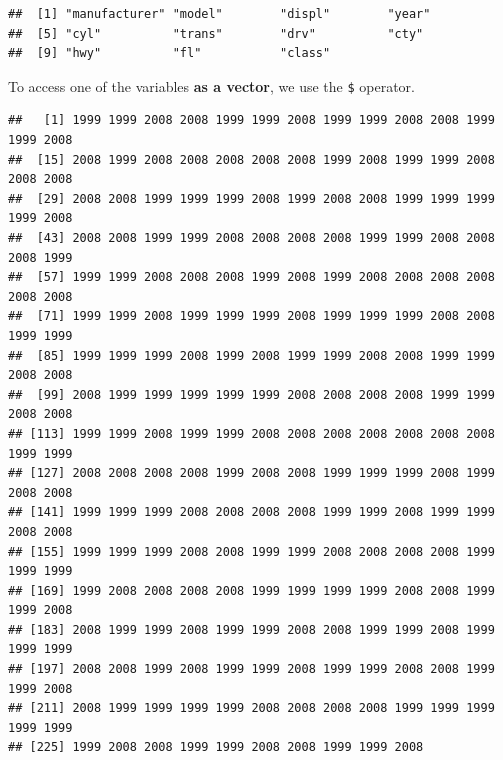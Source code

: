 \documentclass[]{book}
\newenvironment{Shaded}{\begin{snugshade}}{\end{snugshade}}
\newcommand{\OperatorTok}[1]{\textcolor[rgb]{0.81,0.36,0.00}{\textbf{#1}}}
\newcommand{\NormalTok}[1]{#1}
\theoremstyle{definition}
\theoremstyle{definition}
\theoremstyle{definition}
\theoremstyle{remark}
\begin{document}
\begin{verbatim}
##  [1] "manufacturer" "model"        "displ"        "year"        
##  [5] "cyl"          "trans"        "drv"          "cty"         
##  [9] "hwy"          "fl"           "class"
\end{verbatim}

To access one of the variables \textbf{as a vector}, we use the
\texttt{\$} operator.

\begin{Shaded}
\end{Shaded}

\begin{verbatim}
##   [1] 1999 1999 2008 2008 1999 1999 2008 1999 1999 2008 2008 1999 1999 2008
##  [15] 2008 1999 2008 2008 2008 2008 2008 1999 2008 1999 1999 2008 2008 2008
##  [29] 2008 2008 1999 1999 1999 2008 1999 2008 2008 1999 1999 1999 1999 2008
##  [43] 2008 2008 1999 1999 2008 2008 2008 2008 1999 1999 2008 2008 2008 1999
##  [57] 1999 1999 2008 2008 2008 1999 2008 1999 2008 2008 2008 2008 2008 2008
##  [71] 1999 1999 2008 1999 1999 1999 2008 1999 1999 1999 2008 2008 1999 1999
##  [85] 1999 1999 1999 2008 1999 2008 1999 1999 2008 2008 1999 1999 2008 2008
##  [99] 2008 1999 1999 1999 1999 1999 2008 2008 2008 2008 1999 1999 2008 2008
## [113] 1999 1999 2008 1999 1999 2008 2008 2008 2008 2008 2008 2008 1999 1999
## [127] 2008 2008 2008 2008 1999 2008 2008 1999 1999 1999 2008 1999 2008 2008
## [141] 1999 1999 1999 2008 2008 2008 2008 1999 1999 2008 1999 1999 2008 2008
## [155] 1999 1999 1999 2008 2008 1999 1999 2008 2008 2008 2008 1999 1999 1999
## [169] 1999 2008 2008 2008 2008 1999 1999 1999 1999 2008 2008 1999 1999 2008
## [183] 2008 1999 1999 2008 1999 1999 2008 2008 1999 1999 2008 1999 1999 1999
## [197] 2008 2008 1999 2008 1999 1999 2008 1999 1999 2008 2008 1999 1999 2008
## [211] 2008 1999 1999 1999 1999 2008 2008 2008 2008 1999 1999 1999 1999 1999
## [225] 1999 2008 2008 1999 1999 2008 2008 1999 1999 2008
\end{verbatim}

\begin{Shaded}
\end{Shaded}
\end{document}

